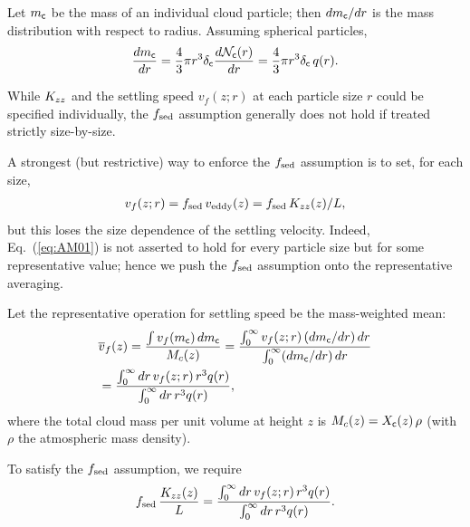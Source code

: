 Let $m_{\mathsf{c}}$ be the mass of an individual cloud particle; then $dm_{\mathsf{c}}/dr$ is the mass distribution with respect to radius.  
Assuming spherical particles,
\begin{align}
    \frac{dm_{\mathsf{c}}}{dr} = \frac{4}{3} \pi r^3 \delta_{\mathsf{c}} \frac{d \mathcal{N}_{\mathsf{c}} (r)}{d r} = \frac{4}{3} \pi r^3 \delta_{\mathsf{c}}\, q(r).
\end{align}

While $K_{zz}$ and the settling speed $v_f(z;r)$ at each particle size $r$ could be specified individually, the $f_\mathrm{sed}$ assumption generally does not hold if treated strictly size-by-size.

A strongest (but restrictive) way to enforce the $f_\mathrm{sed}$ assumption is to set, for each size,
\begin{align}
v_f(z; r)= f_\mathrm{sed}\, v_\mathrm{eddy}(z) = f_\mathrm{sed}\, K_{zz}(z)/L,
\end{align}
but this loses the size dependence of the settling velocity.  
Indeed, Eq.~(\ref{eq:AM01}) is not asserted to hold for every particle size but for some representative value; hence we push the $f_\mathrm{sed}$ assumption onto the representative averaging.

Let the representative operation for settling speed be the mass-weighted mean:
\begin{align}
\label{eq:fsedw}
&\overline{v}_f(z) 
= \frac{\int v_f(m_{\mathsf{c}})\, dm_{\mathsf{c}}}{M_c(z)}
= \frac{\int_0^\infty v_f(z; r)\, (dm_{\mathsf{c}}/dr)\, dr}{ \int_0^\infty (dm_{\mathsf{c}}/dr)\, dr } \nonumber \\
&= \frac{\int_0^\infty dr \, v_f(z;r)\, r^3 q(r)}{ \int_0^\infty dr \, r^3 q(r)},
\end{align}
where the total cloud mass per unit volume at height $z$ is $M_c(z)=X_{\mathsf{c}}(z)\,\rho$ (with $\rho$ the atmospheric mass density).

To satisfy the $f_\mathrm{sed}$ assumption, we require
\begin{align}
\label{eq:fsedw2}
f_\mathrm{sed}\, \frac{K_{zz}(z)}{L} 
= \frac{\int_0^\infty dr \, v_f(z;r)\, r^3 q(r)}{ \int_0^\infty dr \, r^3 q(r)}.
\end{align}

